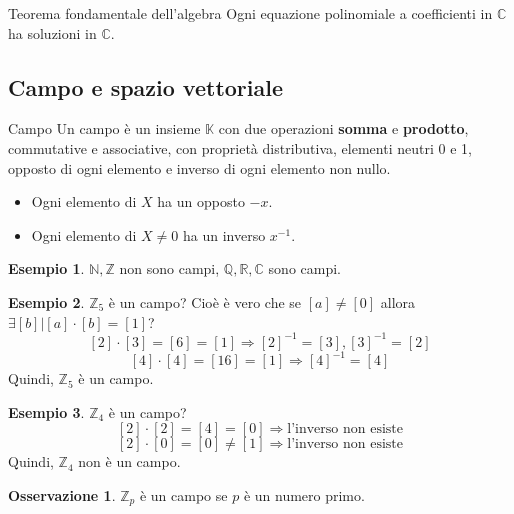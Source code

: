 \documentclass[a4paper]{article}
\theoremstyle{definition}
\newtheorem*{oss}{Osservazione}
\newtheorem*{es}{Esempio}
\begin{document}
\begin{teo}{Teorema fondamentale dell'algebra}{}
	Ogni equazione polinomiale a coefficienti in $\mathbb{C}$ ha soluzioni in $\mathbb{C}$.
\end{teo}

\subsection{Campo e spazio vettoriale}
\begin{deff}{Campo}{}
	Un campo è un insieme $\mathbb{K}$ con due operazioni \textbf{somma} e \textbf{prodotto}, commutative e associative, con proprietà distributiva, elementi neutri 0 e 1, opposto di ogni elemento e inverso di ogni elemento non nullo.
	\begin{itemize}
		\item Ogni elemento di $X$ ha un opposto $-x$.
		\item Ogni elemento di $X \ne 0$ ha un inverso $x^{-1}$.
	\end{itemize}
	\begin{es}
		$\mathbb{N}, \mathbb{Z}$ non sono campi, $\mathbb{Q}, \mathbb{R}, \mathbb{C}$ sono campi.
	\end{es}
\end{deff}

\begin{es}
	$\mathbb{Z}_5$ è un campo? Cioè è vero che se $[a] \ne [0]$ allora $\exists [b] | [a] \cdot [b] = [1]$?
	\[ [2] \cdot [3] = [6] = [1] \Rightarrow [2]^{-1} = [3], [3]^{-1} = [2] \]
	\[ [4] \cdot [4] = [16] = [1] \Rightarrow [4]^{-1} = [4] \]
	Quindi, $\mathbb{Z}_5$ è un campo.
\end{es}

\begin{es}
	$\mathbb{Z}_4$ è un campo?
	\[ [2] \cdot [2] = [4] = [0] \Rightarrow \text{l'inverso non esiste} \]
	\[ [2] \cdot [0] = [0] \ne [1] \Rightarrow \text{l'inverso non esiste} \]
	Quindi, $\mathbb{Z}_4$ non è un campo.
\end{es}

\begin{oss}
	$\mathbb{Z}_p$ è un campo se $p$ è un numero primo.
\end{oss}
\end{document}
